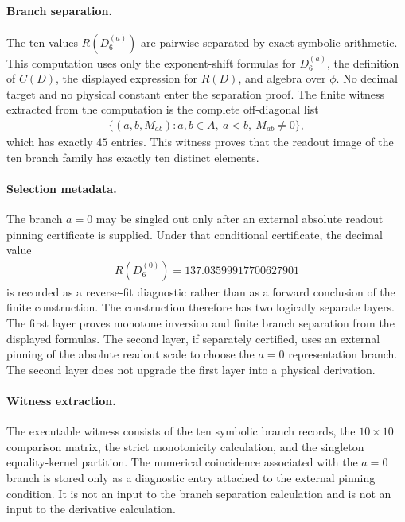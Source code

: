 \paragraph{Branch separation.}
The ten values $R(D_6^{(a)})$ are pairwise separated by exact symbolic arithmetic.  This computation uses only the exponent-shift formulas for $D_6^{(a)}$, the definition of $C(D)$, the displayed expression for $R(D)$, and algebra over $\phi$.  No decimal target and no physical constant enter the separation proof.  The finite witness extracted from the computation is the complete off-diagonal list
$$
\begin{aligned}
\{(a,b,M_{ab}):a,b\in A,\ a<b,\ M_{ab}\ne 0\},
\end{aligned}
$$
which has exactly $45$ entries.  This witness proves that the readout image of the ten branch family has exactly ten distinct elements.

\paragraph{Selection metadata.}
The branch $a=0$ may be singled out only after an external absolute readout pinning certificate is supplied.  Under that conditional certificate, the decimal value
$$
\begin{aligned}
R(D_6^{(0)})=137.03599917700627901
\end{aligned}
$$
is recorded as a reverse-fit diagnostic rather than as a forward conclusion of the finite construction.  The construction therefore has two logically separate layers.  The first layer proves monotone inversion and finite branch separation from the displayed formulas.  The second layer, if separately certified, uses an external pinning of the absolute readout scale to choose the $a=0$ representation branch.  The second layer does not upgrade the first layer into a physical derivation.

\paragraph{Witness extraction.}
The executable witness consists of the ten symbolic branch records, the $10\times 10$ comparison matrix, the strict monotonicity calculation, and the singleton equality-kernel partition.  The numerical coincidence associated with the $a=0$ branch is stored only as a diagnostic entry attached to the external pinning condition.  It is not an input to the branch separation calculation and is not an input to the derivative calculation.

